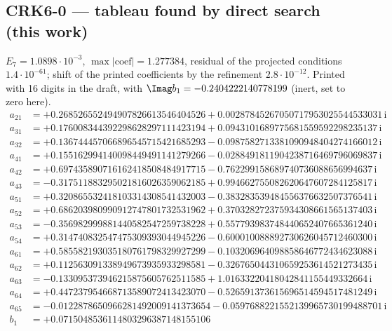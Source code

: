\subsection*{CRK6-0 --- tableau found by direct search (this work)}
$E_{7}=1.0898\cdot10^{-3}$, $\max|\text{coef}|=1.277384$, residual of the projected conditions $1.4\cdot10^{-61}$; shift of the printed coefficients by the refinement $2.8\cdot10^{-12}$. Printed with 16 digits in the draft, with $\Imag b_1=-0.2404222140778199$ (inert, set to zero here).
{\small
\begin{align*}
a_{21} &= +0.268526552494907826613546404526 + 0.00287845267050717953025544533031\,\mathrm{i}\\
a_{31} &= +0.176008344392298628297111423194 + 0.0943101689775681559592298235137\,\mathrm{i}\\
a_{32} &= +0.136744457066896545715421685293 - 0.0987582713381090948404274166012\,\mathrm{i}\\
a_{41} &= +0.155162994140098449491141279266 - 0.0288491811904238716469796069837\,\mathrm{i}\\
a_{42} &= +0.697435890716162418508484917715 - 0.762299158689740736088656994637\,\mathrm{i}\\
a_{43} &= -0.317511883295021816026359062185 + 0.994662755082620647607284125817\,\mathrm{i}\\
a_{51} &= +0.320865532418103314308541432003 - 0.383283539484556376632507376541\,\mathrm{i}\\
a_{52} &= +0.686203980990912747801732531962 + 0.370328272375934308661565137403\,\mathrm{i}\\
a_{53} &= -0.356982999881440582547259738228 + 0.557793983748440652407665361240\,\mathrm{i}\\
a_{54} &= +0.314740832547475309393044945226 - 0.600010088892730626045712460300\,\mathrm{i}\\
a_{61} &= +0.585582193035180761798329927299 - 0.103206964098858646772434623088\,\mathrm{i}\\
a_{62} &= +0.112563091338949673935933298581 - 0.326765044310659253614521273435\,\mathrm{i}\\
a_{63} &= -0.133095373946215875605762511585 + 1.01633220418042841155449332664\,\mathrm{i}\\
a_{64} &= +0.447237954668713589072413423070 - 0.526591373615696514594517481249\,\mathrm{i}\\
a_{65} &= -0.0122878650966281492009141373654 - 0.0597688221552139965730199488701\,\mathrm{i}\\[1mm]
b_{1} &= +0.0715048536114803296387148155106\\

\end{align*}}
